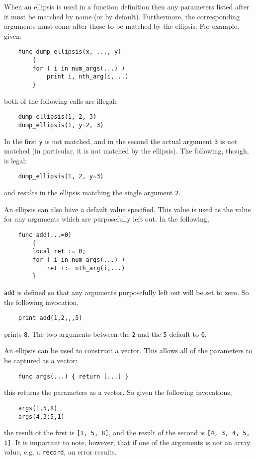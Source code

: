 When an ellipsis is used in a function definition then any parameters
listed after it must be matched by name (or by default).  Furthermore,
the corresponding arguments must come after those to be matched by
the ellipsis.  For example, given:
\begin{verbatim}
    func dump_ellipsis(x, ..., y)
        {
        for ( i in num_args(...) )
            print i, nth_arg(i,...)
        }
\end{verbatim}
both of the following calls are illegal:
\begin{verbatim}
    dump_ellipsis(1, 2, 3)
    dump_ellipsis(1, y=2, 3)
\end{verbatim}
In the first {\tt y} is not matched, and in the second the actual
argument {\tt 3} is not matched (in particular, it is not matched
by the ellipsis).  The following, though, is legal:
\begin{verbatim}
    dump_ellipsis(1, 2, y=3)
\end{verbatim}
and results in the ellipsis matching the single argument {\tt 2}.

\label{defaulted-ellipsis}
An ellipsis can also have a default value specified. This value is 
used as the value for any arguments which are purposefully left
out. In the following,
\begin{verbatim}
    func add(...=0)
        {
        local ret := 0;
        for ( i in num_args(...) )
            ret +:= nth_arg(i,...)
        }
\end{verbatim}
{\tt add} is defined so that any arguments purposefully left
out will be set to zero. So the following invocation,
\begin{verbatim}
    print add(1,2,,,5)
\end{verbatim}
prints {\tt 8}. The two arguments between the {\tt 2} and the {\tt 5}
default to {\tt 0}.

\label{ellipsis-vector-construction}
An ellipsis can be used to construct a vector. This allows all of the
parameters to be captured as a vector:
\begin{verbatim}
    func args(...) { return [...] }
\end{verbatim}
this returns the parameters as a vector. So given the following
invocations,
\begin{verbatim}
    args(1,5,8)
    args(4,3:5,1)
\end{verbatim}
the result of the first is {\tt [1, 5, 8]}, and the result of the second
is {\tt [4, 3, 4, 5, 1]}. It is important to note, however, that if one
of the arguments is not an array value, e.g. a {\tt record}, an error
results.

